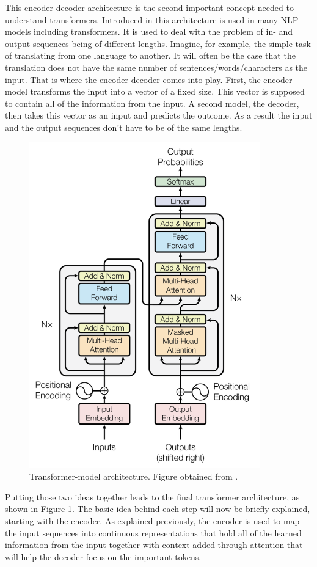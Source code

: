 This encoder-decoder architecture is the second important concept needed to understand transformers. Introduced in \citet{sutskever2014sequence} this architecture is used in many NLP models including transformers. It is used to deal with the problem of in- and output sequences being of different lengths. Imagine, for example, the simple task of translating from one language to another. It will often be the case that the translation does not have the same number of sentences/words/characters as the input. That is where the encoder-decoder comes into play. First, the encoder model transforms the input into a vector of a fixed size. This vector is supposed to contain all of the information from the input. A second model, the decoder, then takes this vector as an input and predicts the outcome. As a result the input and the output sequences don't have to be of the same lengths. 

\begin{figure}[h!]
\centering
\includegraphics[width = 10cm]{figures/Transformer.png}
\caption{Transformer-model architecture. Figure obtained from \citet{vaswani2017attention}.}
\label{fig:transformer}
\end{figure}

Putting those two ideas together leads to the final transformer architecture, as shown in Figure \ref{fig:transformer}. The basic idea behind each step will now be briefly explained, starting with the encoder. As explained previously, the encoder is used to map the input sequences into continuous representations that hold all of the learned information from the input together with context added through attention that will help the decoder focus on the important tokens.

